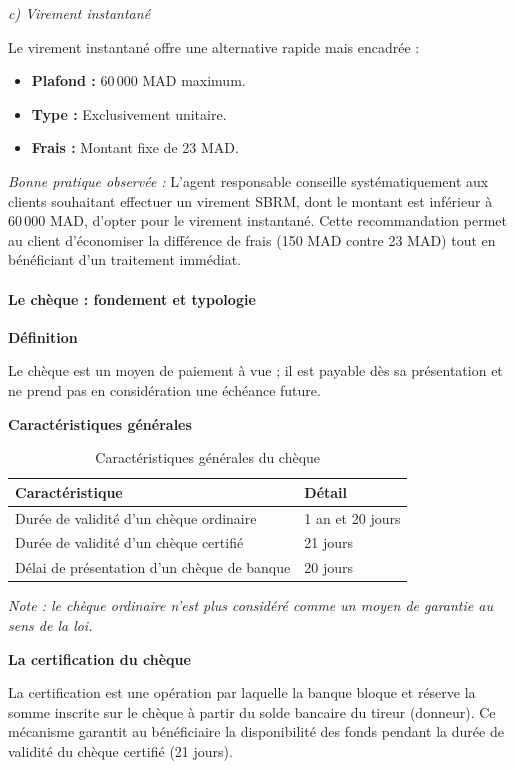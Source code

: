 \documentclass[12pt,a4paper]{report}
\begin{document}
\medskip\textit{c) Virement instantané}

Le virement instantané offre une alternative rapide mais encadrée :
\begin{itemize}
  \item \textbf{Plafond :} 60\,000 MAD maximum.
  \item \textbf{Type :} Exclusivement unitaire.
  \item \textbf{Frais :} Montant fixe de 23 MAD.
\end{itemize}

\textit{Bonne pratique observée :} L'agent responsable conseille systématiquement aux clients souhaitant effectuer un virement SBRM, dont le montant est inférieur à 60\,000 MAD, d'opter pour le virement instantané. Cette recommandation permet au client d'économiser la différence de frais (150 MAD contre 23 MAD) tout en bénéficiant d'un traitement immédiat.

\paragraph{Le chèque : fondement et typologie}

\medskip\textbf{Définition}

Le chèque est un moyen de paiement à vue ; il est payable dès sa présentation et ne prend pas en considération une échéance future.

\medskip\textbf{Caractéristiques générales}

\begin{table}[h!]
\centering
\begin{tabularx}{\textwidth}{X X}
\toprule
Caractéristique & Détail \\
\midrule
Durée de validité d'un chèque ordinaire & 1 an et 20 jours \\
Durée de validité d'un chèque certifié & 21 jours \\
Délai de présentation d'un chèque de banque & 20 jours \\
\bottomrule
\end{tabularx}
\caption{Caractéristiques générales du chèque}
\end{table}

\textit{Note : le chèque ordinaire n'est plus considéré comme un moyen de garantie au sens de la loi.}

\medskip\textbf{La certification du chèque}

La certification est une opération par laquelle la banque bloque et réserve la somme inscrite sur le chèque à partir du solde bancaire du tireur (donneur). Ce mécanisme garantit au bénéficiaire la disponibilité des fonds pendant la durée de validité du chèque certifié (21 jours).
\end{document}
